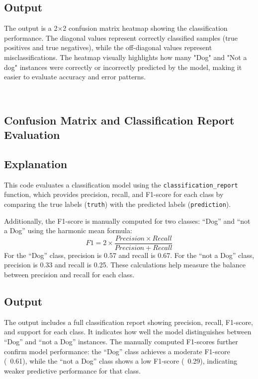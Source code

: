 \documentclass[11pt,a4paper]{report}
\begin{document}
\subsection*{Output}
The output is a 2×2 confusion matrix heatmap showing the classification performance. The diagonal values represent correctly classified samples (true positives and true negatives), while the off-diagonal values represent misclassifications. The heatmap visually highlights how many "Dog" and "Not a dog" instances were correctly or incorrectly predicted by the model, making it easier to evaluate accuracy and error patterns.

    \begin{center}
    \end{center}
    { \hspace*{\fill} \\}


\subsection{Confusion Matrix and Classification Report Evaluation}

\subsection*{Explanation}
This code evaluates a classification model using the \texttt{classification\_report} function, which provides precision, recall, and F1-score for each class by comparing the true labels (\texttt{truth}) with the predicted labels (\texttt{prediction}). 

Additionally, the F1-score is manually computed for two classes: “Dog” and “not a Dog” using the harmonic mean formula:
\[
F1 = 2 \times \frac{Precision \times Recall}{Precision + Recall}
\]
For the “Dog” class, precision is 0.57 and recall is 0.67. For the “not a Dog” class, precision is 0.33 and recall is 0.25. These calculations help measure the balance between precision and recall for each class.

\subsection*{Output}
The output includes a full classification report showing precision, recall, F1-score, and support for each class. It indicates how well the model distinguishes between “Dog” and “not a Dog” instances. The manually computed F1-scores further confirm model performance: the “Dog” class achieves a moderate F1-score (~0.61), while the “not a Dog” class shows a low F1-score (~0.29), indicating weaker predictive performance for that class.
    
\end{document}
